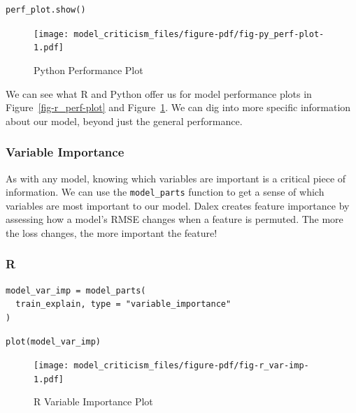\documentclass[
  letterpaper,
]{krantz}
\begin{document}
\begin{verbatim}
perf_plot.show()
\end{verbatim}

\begin{figure}[H]

{\centering \texttt{[image: model\_criticism\_files/figure-pdf/fig-py\_perf-plot-1.pdf]}

}

\caption{\label{fig-py_perf-plot}Python Performance Plot}

\end{figure}

We can see what R and Python offer us for model performance plots in
Figure~\ref{fig-r_perf-plot} and Figure~\ref{fig-py_perf-plot}. We can
dig into more specific information about our model, beyond just the
general performance.

\subsubsection{Variable Importance}\label{variable-importance}

As with any model, knowing which variables are important is a critical
piece of information. We can use the \texttt{model\_parts} function to
get a sense of which variables are most important to our model. Dalex
creates feature importance by assessing how a model's RMSE changes when
a feature is permuted. The more the loss changes, the more important the
feature!

\subsubsection{R}

\begin{verbatim}
model_var_imp = model_parts(
  train_explain, type = "variable_importance"
)
\end{verbatim}

\begin{verbatim}
plot(model_var_imp)
\end{verbatim}

\begin{figure}[H]

{\centering \texttt{[image: model\_criticism\_files/figure-pdf/fig-r\_var-imp-1.pdf]}

}

\caption{\label{fig-r_var-imp}R Variable Importance Plot}

\end{figure}
\end{document}
